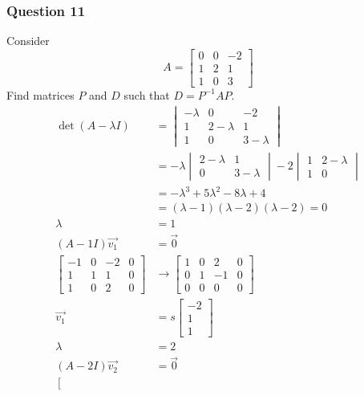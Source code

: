 \documentclass{math}
\begin{document}
\subsubsection*{Question 11}
Consider
\[ A = \begin{bmatrix}
  0 & 0 & -2 \\
  1 & 2 & 1 \\
  1 & 0 & 3
\end{bmatrix} \]
Find matrices \( P \) and \( D \) such that \( D = P^{-1}AP \).
\begin{align*}
  \det(A-\lambda I) &= \begin{vmatrix}
    -\lambda & 0 & -2 \\
    1 & 2-\lambda & 1 \\
    1 & 0 & 3-\lambda
  \end{vmatrix} \\
  &= -\lambda\begin{vmatrix}2-\lambda & 1 \\ 0 & 3-\lambda\end{vmatrix}-
    2\begin{vmatrix}1 & 2-\lambda \\ 1 & 0\end{vmatrix} \\
  &= -\lambda^3+5\lambda^2-8\lambda+4 \\
  &= (\lambda-1)(\lambda-2)(\lambda-2) = 0 \\
  \lambda &= 1 \\
  (A-1I)\vec{v_1} &= \vec{0} \\
  \left[\begin{array}{ccc|c}
    -1 & 0 & -2 & 0 \\
    1 & 1 & 1 & 0 \\
    1 & 0 & 2 & 0
  \end{array}\right] &\to \left[\begin{array}{ccc|c}
    1 & 0 & 2 & 0 \\
    0 & 1 & -1 & 0 \\
    0 & 0 & 0 & 0
  \end{array}\right] \\
  \vec{v_1} &= s\begin{bmatrix}-2 \\ 1 \\ 1\end{bmatrix} \\
  \lambda &= 2 \\
  (A-2I)\vec{v_2} &= \vec{0} \\
  \left[\begin{array}{ccc|c}

\end{array}
\end{align*}
\end{document}
